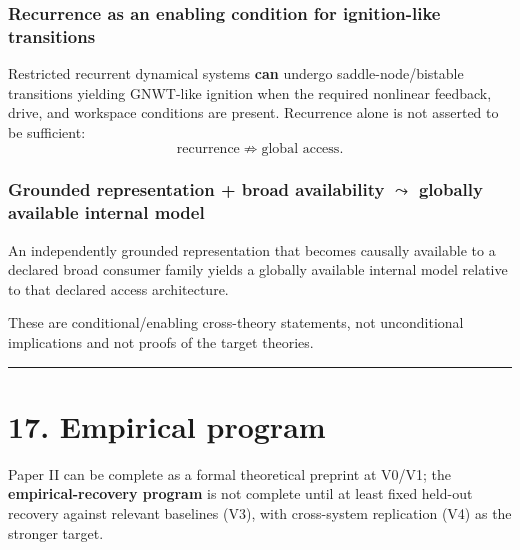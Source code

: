 \documentclass[
  11pt,
  a4paper,
]{article}
\begin{document}
\hypertarget{recurrence-as-an-enabling-condition-for-ignition-like-transitions}{%
\subsubsection{Recurrence as an enabling condition for ignition-like
transitions}\label{recurrence-as-an-enabling-condition-for-ignition-like-transitions}}

Restricted recurrent dynamical systems \textbf{can} undergo
saddle-node/bistable transitions yielding GNWT-like ignition when the
required nonlinear feedback, drive, and workspace conditions are
present. Recurrence alone is not asserted to be sufficient:
\nopagebreak[4]
\[
\text{recurrence}
\not\Rightarrow
\text{global access}.
\]

\hypertarget{grounded-representation-broad-availability-leadsto-globally-available-internal-model}{%
\subsubsection{\texorpdfstring{Grounded representation + broad
availability \(\leadsto\) globally available internal
model}{Grounded representation + broad availability \textbackslash leadsto globally available internal model}}\label{grounded-representation-broad-availability-leadsto-globally-available-internal-model}}

An independently grounded representation that becomes causally available
to a declared broad consumer family yields a globally available internal
model relative to that declared access architecture.

These are conditional/enabling cross-theory statements, not
unconditional implications and not proofs of the target theories.

\begin{center}\rule{0.5\linewidth}{0.5pt}\end{center}

\hypertarget{empirical-program}{%
\section{17. Empirical program}\label{empirical-program}}

Paper II can be complete as a formal theoretical preprint at V0/V1; the
\textbf{empirical-recovery program} is not complete until at least fixed
held-out recovery against relevant baselines (V3), with cross-system
replication (V4) as the stronger target.
\end{document}
